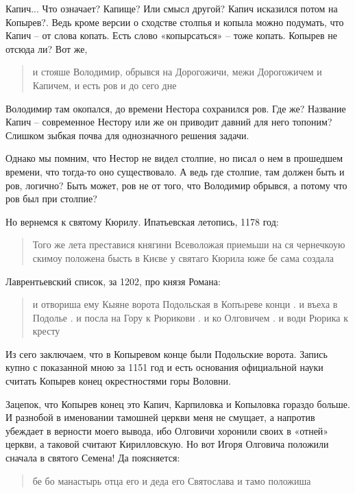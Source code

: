 \documentclass[a5paper,11pt,openany]{article}
\begin{document}
Капич... Что означает? Капище? Или смысл другой? Капич исказился потом на Копырев?. Ведь кроме версии о сходстве столпья и копыла можно подумать, что Капич – от слова копать. Есть слово «копырсаться» – тоже копать. Копырев не отсюда ли? Вот же,

\begin{quotation}
\noindent и стояше Володимир, обрывся на Дорогожичи, межи Дорогожичем и Капичем, и есть ров и до сего дне
\end{quotation}

Володимир там окопался, до времени Нестора сохранился ров. Где же? Название Капич – современное Нестору или же он приводит давний для него топоним? Слишком зыбкая почва для однозначного решения задачи.

Однако мы помним, что Нестор не видел столпие, но писал о нем в прошедшем времени, что тогда-то оно существовало. А ведь где столпие, там должен быть и ров, логично? Быть может, ров не от того, что Володимир обрывся, а потому что ров был при столпие? 

Но вернемся к святому Кюрилу. Ипатьевская летопись, 1178 год:

\begin{quotation}
\noindent Того же лета преставися княгини Всеволожая приемьши на ся чернечкоую скимоу положена бысть в Києве у святаго Кюрила юже бе сама создала
\end{quotation}

Лаврентьевский список, за 1202, про князя Романа:

\begin{quotation}
\noindent и отвориша ему Кыяне ворота Подольская в Копъıреве конци . и въеха в Подолье . и посла на Гору к Рюрикови . и ко Олговичем . и води Рюрика к кресту
\end{quotation}

Из сего заключаем, что в Копыревом конце были Подольские ворота. Запись купно с показанной мною за 1151 год и есть основания официальной науки считать Копырев конец окрестностями горы Воловни.

Зацепок, что Копырев конец это Капич, Карпиловка и Копыловка гораздо больше. И разнобой в именовании тамошней церкви меня не смущает, а напротив убеждает в верности моего вывода, ибо Олговичи хоронили своих в «отней» церкви, а таковой считают Кирилловскую. Но вот Игоря Олговича положили сначала в святого Семена! Да поясняется:

\begin{quotation}
\noindent бе бо манастырь отца его и деда его Святослава и тамо положиша
\end{quotation}
\end{document}
